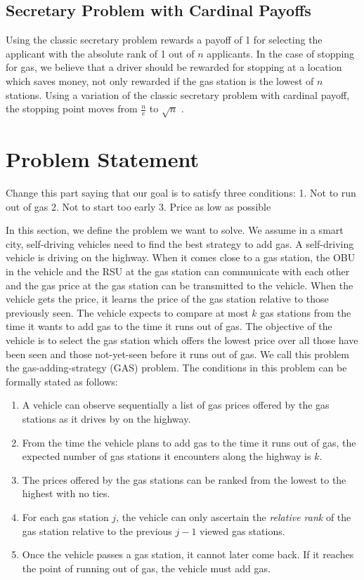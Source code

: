 \documentclass[conference]{IEEEtran}
\theoremstyle{definition}
\begin{document}
\subsection{Secretary Problem with Cardinal Payoffs}
Using the classic secretary problem rewards a payoff of 1 for selecting the applicant with the absolute rank of 1 out of $n$ applicants. In the case of stopping for gas, we believe that a driver should be rewarded for stopping at a location which saves money, not only rewarded if the gas station is the lowest of $n$ stations. Using a variation of the classic secretary problem with cardinal payoff, the stopping point moves from $\frac{n}{e}$ to $\sqrt{n}$ \cite{ferenstein:hal-00602313}.

\section{Problem Statement} \label{problem}
{\color{red} Change this part saying that our goal is to satisfy three conditions:
1. Not to run out of gas 2. Not to start too early 3. Price as low as possible }

In this section, we define the problem we want to solve. We assume in a smart city, self-driving vehicles need to find the best strategy to add gas. A self-driving vehicle is driving on the highway. When it comes close to a gas station, the OBU in the vehicle and the RSU at the gas station can communicate with each other and the gas price at the gas station can be transmitted to the vehicle. When the vehicle gets the price, it learns the price of the gas station relative to those previously seen. The vehicle expects to compare at most $k$ gas stations from the time it wants to add gas to the time it runs out of gas. The objective of the vehicle is to select the gas station which offers the lowest price over all those have been seen and those not-yet-seen before it runs out of gas. We call this problem the gas-adding-strategy (GAS) problem. The conditions in this problem can be formally stated as follows:

\begin{enumerate}
\item A vehicle can observe sequentially a list of gas prices offered by the gas stations as it drives by on the highway.
\item From the time the vehicle plans to add gas to the time it runs out of gas, the expected number of gas stations it encounters along the highway is $k$.
\item The prices offered by the gas stations can be ranked from the lowest to the highest with no ties.
\item For each gas station $j$, the vehicle can only ascertain the {\em relative rank} of the gas station relative to the previous $j-1$ viewed gas stations.
\item Once the vehicle passes a gas station, it cannot later come back. If it reaches the point of running out of gas, the vehicle must add gas.
\end{enumerate}
\end{document}
